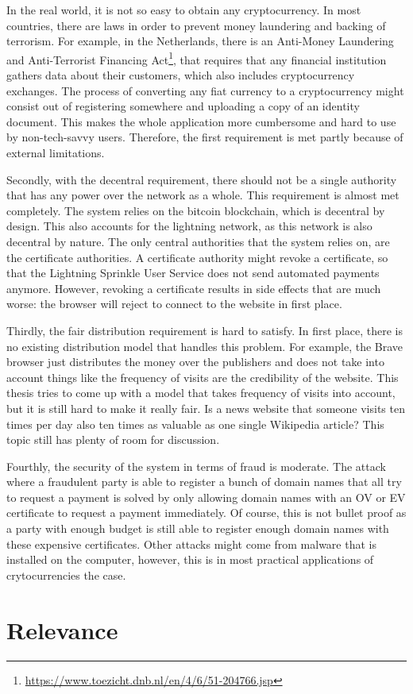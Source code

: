 In the real world, it is not so easy to obtain any cryptocurrency. In most countries, there are laws in order to prevent money laundering and backing of terrorism. For example, in the Netherlands, there is an Anti-Money Laundering and Anti-Terrorist Financing Act\footnote{\url{https://www.toezicht.dnb.nl/en/4/6/51-204766.jsp}}, that requires that any financial institution gathers data about their customers, which also includes cryptocurrency exchanges. The process of converting any fiat currency to a cryptocurrency might consist out of registering somewhere and uploading a copy of an identity document. This makes the whole application more cumbersome and hard to use by non-tech-savvy users. Therefore, the first requirement is met partly because of external limitations.

Secondly, with the decentral requirement, there should not be a single authority that has any power over the network as a whole. This requirement is almost met completely. The system relies on the bitcoin blockchain, which is decentral by design. This also accounts for the lightning network, as this network is also decentral by nature. The only central authorities that the system relies on, are the certificate authorities. A certificate authority might revoke a certificate, so that the Lightning Sprinkle User Service does not send automated payments anymore. However, revoking a certificate results in side effects that are much worse: the browser will reject to connect to the website in first place. 

Thirdly, the fair distribution requirement is hard to satisfy. In first place, there is no existing distribution model that handles this problem. For example, the Brave browser just distributes the money over the publishers and does not take into account things like the frequency of visits are the credibility of the website. This thesis tries to come up with a model that takes frequency of visits into account, but it is still hard to make it really fair. Is a news website that someone visits ten times per day also ten times as valuable as one single Wikipedia article? This topic still has plenty of room for discussion. 

Fourthly, the security of the system in terms of fraud is moderate. The attack where a fraudulent party is able to register a bunch of domain names that all try to request a payment is solved by only allowing domain names with an OV or EV certificate to request a payment immediately. Of course, this is not bullet proof as a party with enough budget is still able to register enough domain names with these expensive certificates. Other attacks might come from malware that is installed on the computer, however, this is in most practical applications of crytocurrencies the case.

\section{Relevance}
